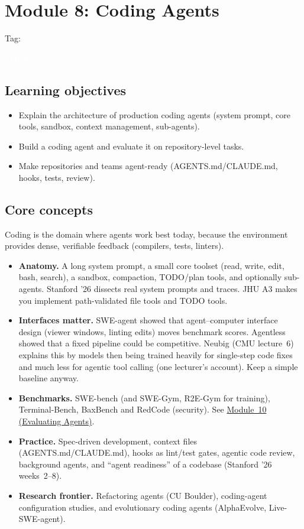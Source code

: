 \documentclass[10pt,oneside]{report}
\newcommand{\tg}[1]{{\setlength{\fboxsep}{1.2pt}\colorbox{tag#1}{\kern1pt\textcolor{white}{\sffamily\bfseries\fontsize{5.5}{6}\selectfont\strut #1}\kern1.5pt}}}
\begin{document}
\chapter{Module 8: Coding Agents}\hypertarget{mod-CODE}{}
{\small Tag: \tg{CODE}}
\section{Learning objectives}
\begin{itemize}
\item Explain the architecture of production coding agents (system prompt, core tools, sandbox, context management, sub-agents).
\item Build a coding agent and evaluate it on repository-level tasks.
\item Make repositories and teams agent-ready (AGENTS.md/CLAUDE.md, hooks, tests, review).
\end{itemize}
\section{Core concepts}
Coding is the domain where agents work best today, because the environment provides dense, verifiable feedback (compilers, tests, linters).
\begin{itemize}
\item \textbf{Anatomy.} A long system prompt, a small core toolset (read, write, edit, bash, search), a sandbox, compaction, TODO/plan tools, and optionally sub-agents. Stanford '26 dissects real system prompts and traces. JHU A3 makes you implement path-validated file tools and TODO tools.
\item \textbf{Interfaces matter.} SWE-agent showed that agent--computer interface design (viewer windows, linting edits) moves benchmark scores. Agentless showed that a fixed pipeline could be competitive. Neubig (CMU lecture~6) explains this by models then being trained heavily for single-step code fixes and much less for agentic tool calling (one lecturer's account). Keep a simple baseline anyway.
\item \textbf{Benchmarks.} SWE-bench (and SWE-Gym, R2E-Gym for training), Terminal-Bench, BaxBench and RedCode (security). See \hyperlink{mod-EVAL}{Module~10 (Evaluating Agents)}.
\item \textbf{Practice.} Spec-driven development, context files (AGENTS.md/CLAUDE.md), hooks as lint/test gates, agentic code review, background agents, and ``agent readiness'' of a codebase (Stanford '26 weeks~2--8).
\item \textbf{Research frontier.} Refactoring agents (CU Boulder), coding-agent configuration studies, and evolutionary coding agents (AlphaEvolve, Live-SWE-agent).
\end{itemize}
\end{document}
